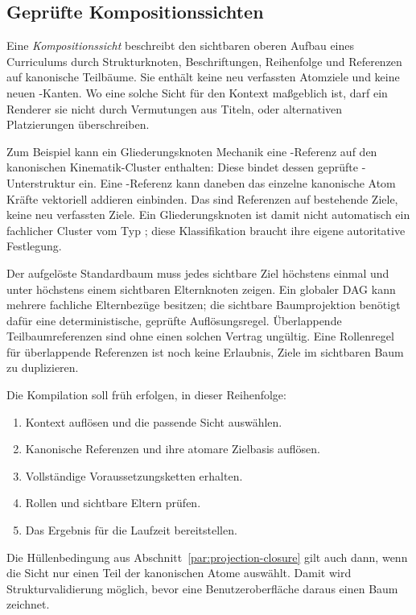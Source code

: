 \subsection{Geprüfte Kompositionssichten}
\label{sec:composition-views}

Eine \emph{Kompositionssicht} beschreibt den sichtbaren oberen Aufbau eines
Curriculums durch Strukturknoten, Beschriftungen, Reihenfolge und
Referenzen auf kanonische Teilbäume. Sie enthält keine neu verfassten
Atomziele und keine neuen -Kanten. Wo eine solche Sicht
für den Kontext maßgeblich ist, darf ein Renderer sie nicht durch
Vermutungen aus Titeln,  oder alternativen Platzierungen
überschreiben.

Zum Beispiel kann ein Gliederungsknoten \glqq Mechanik\grqq{} eine
-Referenz auf den kanonischen Kinematik-Cluster
enthalten: Diese bindet dessen geprüfte -Unterstruktur ein.
Eine -Referenz kann daneben das einzelne kanonische Atom
\glqq Kräfte vektoriell addieren\grqq{} einbinden. Das sind Referenzen
auf bestehende Ziele, keine neu verfassten Ziele. Ein Gliederungsknoten ist
damit nicht automatisch ein fachlicher Cluster vom Typ
; diese Klassifikation braucht ihre eigene autoritative
Festlegung.

Der aufgelöste Standardbaum muss jedes sichtbare Ziel höchstens einmal
und unter höchstens einem sichtbaren Elternknoten zeigen. Ein globaler
DAG kann mehrere fachliche Elternbezüge besitzen; die sichtbare
Baumprojektion benötigt dafür eine deterministische, geprüfte
Auflösungsregel. Überlappende Teilbaumreferenzen sind ohne einen solchen
Vertrag ungültig. Eine Rollenregel für überlappende Referenzen ist noch
keine Erlaubnis, Ziele im sichtbaren Baum zu duplizieren.

Die Kompilation soll früh erfolgen, in dieser Reihenfolge:
\begin{enumerate}
\item Kontext auflösen und die passende Sicht auswählen.
\item Kanonische Referenzen und ihre atomare Zielbasis auflösen.
\item Vollständige Voraussetzungsketten erhalten.
\item Rollen und sichtbare Eltern prüfen.
\item Das Ergebnis für die Laufzeit bereitstellen.
\end{enumerate}
Die Hüllenbedingung aus Abschnitt~\ref{par:projection-closure} gilt auch
dann, wenn die Sicht nur einen Teil der kanonischen Atome auswählt. Damit
wird Strukturvalidierung möglich, bevor eine Benutzeroberfläche daraus einen
Baum zeichnet.

